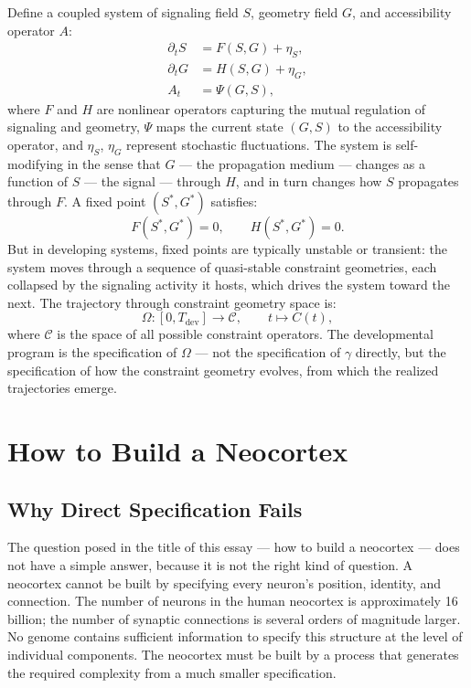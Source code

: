 \documentclass[12pt, a4paper, openany]{book}
\theoremstyle{definition}
\theoremstyle{remark}
\begin{document}
Define a coupled system of signaling field $S$, geometry field $G$, and accessibility operator $A$:
\begin{align}
\partial_t S &= F(S, G) + \eta_S, \\
\partial_t G &= H(S, G) + \eta_G, \\
A_t &= \Psi(G, S),
\end{align}
where $F$ and $H$ are nonlinear operators capturing the mutual regulation of signaling and geometry, $\Psi$ maps the current state $(G,S)$ to the accessibility operator, and $\eta_S$, $\eta_G$ represent stochastic fluctuations. The system is self-modifying in the sense that $G$ — the propagation medium — changes as a function of $S$ — the signal — through $H$, and in turn changes how $S$ propagates through $F$. A fixed point $(S^*, G^*)$ satisfies:
\begin{equation}
F(S^*, G^*) = 0, \qquad H(S^*, G^*) = 0.
\end{equation}
But in developing systems, fixed points are typically unstable or transient: the system moves through a sequence of quasi-stable constraint geometries, each collapsed by the signaling activity it hosts, which drives the system toward the next. The trajectory through constraint geometry space is:
\begin{equation}
\Omega : [0, T_{\text{dev}}] \to \mathcal{C}, \qquad t \mapsto C(t),
\end{equation}
where $\mathcal{C}$ is the space of all possible constraint operators. The developmental program is the specification of $\Omega$ — not the specification of $\gamma$ directly, but the specification of how the constraint geometry evolves, from which the realized trajectories emerge.


\chapter{How to Build a Neocortex}

\section{Why Direct Specification Fails}

The question posed in the title of this essay — how to build a neocortex — does not have a simple answer, because it is not the right kind of question. A neocortex cannot be built by specifying every neuron's position, identity, and connection. The number of neurons in the human neocortex is approximately 16 billion; the number of synaptic connections is several orders of magnitude larger. No genome contains sufficient information to specify this structure at the level of individual components. The neocortex must be built by a process that generates the required complexity from a much smaller specification.
\end{document}
